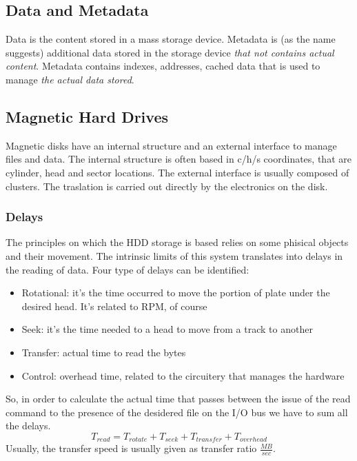\documentclass[10pt,a4paper]{article}
\begin{document}
			\subsection{Data and Metadata}
				Data is the content stored in a mass storage device. Metadata is (as the name suggests) additional data stored in the storage device \emph{that not contains actual content}. Metadata contains indexes, addresses, cached data that is used to manage \emph{the actual data stored}.
				
			\subsection{Magnetic Hard Drives}
				Magnetic disks have an internal structure and an external interface to manage files and data. The internal structure is often based in c/h/s coordinates, that are cylinder, head and sector locations. The external interface is usually composed of clusters. The traslation is carried out directly by the electronics on the disk.
				
				\subsubsection{Delays}
					The principles on which the HDD storage is based relies on some phisical objects and their movement. The intrinsic limits of this system translates into delays in the reading of data. Four type of delays can be identified:
					\begin{itemize}
						\item Rotational: it's the time occurred to move the portion of plate under the desired head. It's related to RPM, of course
						\item Seek: it's the time needed to a head to move from a track to another
						\item Transfer: actual time to read the bytes
						\item Control: overhead time, related to the circuitery that manages the hardware
					\end{itemize}
					
					So, in order to calculate the actual time that passes between the issue of the read command to the presence of the desidered file on the I/O bus we have to sum all the delays.
					\begin{equation}
						T_{read} = T_{rotate} + T_{seek} + T_{transfer} + T_{overhead}
					\end{equation}
					Usually, the transfer speed is usually given as transfer ratio $\frac{MB}{sec}$. 
					
\end{document}
